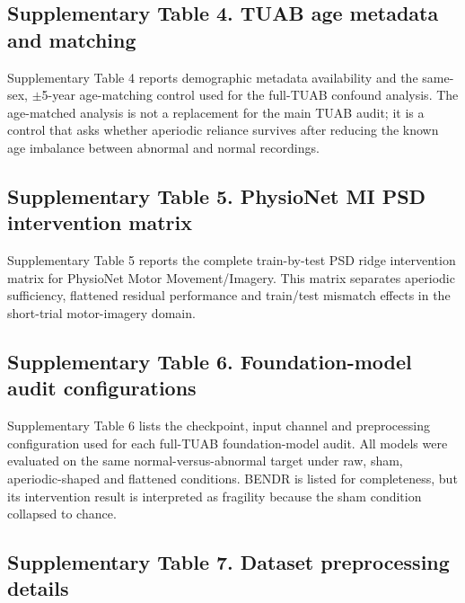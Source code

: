 

\subsection*{Supplementary Table 4. TUAB age metadata and matching}

Supplementary Table 4 reports demographic metadata availability and the same-sex, $\pm$5-year age-matching control used for the full-TUAB confound analysis. The age-matched analysis is not a replacement for the main TUAB audit; it is a control that asks whether aperiodic reliance survives after reducing the known age imbalance between abnormal and normal recordings.



\subsection*{Supplementary Table 5. PhysioNet MI PSD intervention matrix}

Supplementary Table 5 reports the complete train-by-test PSD ridge intervention matrix for PhysioNet Motor Movement/Imagery. This matrix separates aperiodic sufficiency, flattened residual performance and train/test mismatch effects in the short-trial motor-imagery domain.



\subsection*{Supplementary Table 6. Foundation-model audit configurations}

Supplementary Table 6 lists the checkpoint, input channel and preprocessing configuration used for each full-TUAB foundation-model audit. All models were evaluated on the same normal-versus-abnormal target under raw, sham, aperiodic-shaped and flattened conditions. BENDR is listed for completeness, but its intervention result is interpreted as fragility because the sham condition collapsed to chance.



\subsection*{Supplementary Table 7. Dataset preprocessing details}

